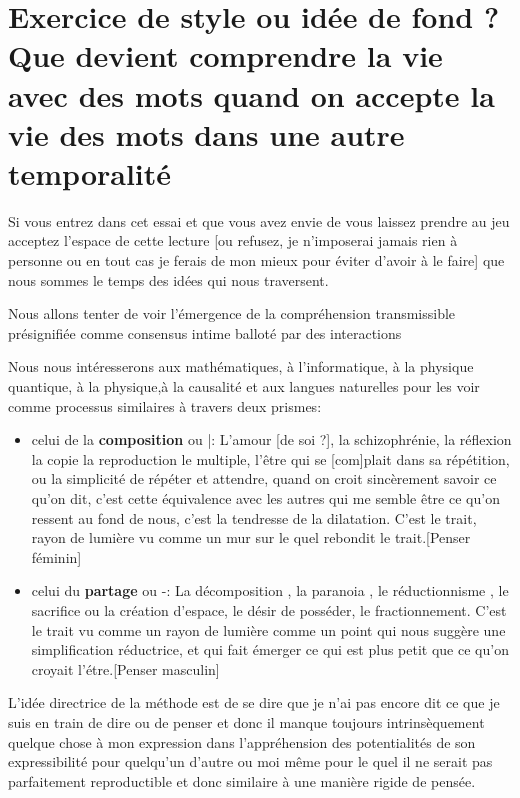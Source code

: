 \documentclass{article}
\begin{document}
\section{Exercice de style ou idée de fond ? Que devient comprendre la vie avec des mots  quand on accepte la vie des mots dans une autre temporalité}

Si vous entrez dans cet essai et que vous avez envie de vous laissez prendre au jeu acceptez l'espace de cette lecture [ou refusez, je n'imposerai jamais rien à personne ou en tout cas je ferais de mon mieux pour éviter d'avoir à le faire] que nous sommes le temps des idées qui nous traversent.

Nous allons tenter de voir l'émergence de la compréhension transmissible présignifiée comme consensus intime balloté par des interactions

Nous nous intéresserons aux mathématiques, à l'informatique, à la physique quantique, à la physique,à la causalité et aux langues naturelles pour les voir comme processus similaires à travers deux prismes:
\begin{itemize}
\item celui de la \textbf {composition} ou |:
L'amour [de soi ?], la schizophrénie,   la réflexion la copie la reproduction le multiple, l'être qui se [com]plait dans sa répétition, ou la simplicité de répéter et attendre, quand on croit sincèrement savoir  ce qu'on dit, c'est cette équivalence avec les autres qui me semble être ce qu'on ressent au fond de nous, c'est la tendresse de la dilatation. C'est le trait, rayon de lumière  vu comme un mur sur le quel rebondit le trait.[Penser féminin]
\item celui du  \textbf{partage} ou -:
La décomposition , la paranoia , le réductionnisme , le sacrifice ou la création d'espace, le désir de posséder, le fractionnement. C'est le trait vu comme un rayon de lumière comme un point qui nous suggère une simplification réductrice, et qui fait émerger ce qui est plus petit que ce qu'on croyait l'étre.[Penser masculin]
\end{itemize}

L'idée directrice de la méthode est de se dire que je n'ai pas encore dit ce que je suis en train de dire ou de penser et donc il manque toujours intrinsèquement quelque chose à mon expression dans l'appréhension des potentialités de son expressibilité pour quelqu'un d'autre ou moi même pour le quel il ne serait pas parfaitement reproductible et donc similaire à une manière rigide de pensée. 
\end{document}

